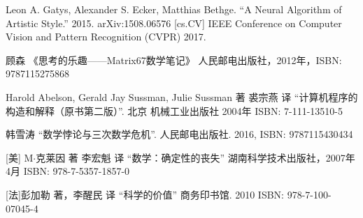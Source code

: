 \documentclass{article}
\begin{document}
\ifx\wholebook\relax \else
\begin{thebibliography}{99}

Leon A. Gatys, Alexander S. Ecker, Matthias Bethge. ``A Neural Algorithm of Artistic Style.'' 2015. arXiv:1508.06576 [cs.CV] IEEE Conference on Computer Vision and Pattern Recognition (CVPR) 2017.

顾森 《思考的乐趣——Matrix67数学笔记》 人民邮电出版社，2012年，ISBN: 9787115275868

Harold Abelson, Gerald Jay Sussman, Julie Sussman 著 裘宗燕 译 ``计算机程序的构造和解释（原书第二版）''. 北京 机械工业出版社 2004年 ISBN: 7-111-13510-5

韩雪涛 ``数学悖论与三次数学危机''. 人民邮电出版社. 2016, ISBN: 9787115430434

[美] M$\cdot$克莱因 著 李宏魁 译 ``数学：确定性的丧失'' 湖南科学技术出版社，2007年4月 ISBN: 978-7-5357-1857-0

[法]彭加勒 著，李醒民 译 ``科学的价值'' 商务印书馆. 2010 ISBN: 978-7-100-07045-4

\end{thebibliography}

\expandafter\enddocument

\fi
\end{document}
